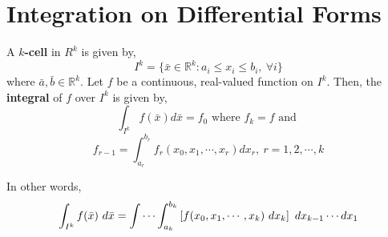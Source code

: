 \section{Integration on Differential Forms}
\begin{definition}
	A \textbf{$k$-cell} in $R^k$ is given by, 
	$$I^k = \{ \bar{x} \in \mathbb{R}^k : a_i \le x_i \le b_i,\ \forall i \}$$
	where $\bar{a},\bar{b} \in \mathbb{R}^k$.
	Let $f$ be a continuous, real-valued function on $I^k$.
	Then, the \textbf{integral} of $f$ over $I^k$ is given by,
	$$\int_{I^k}f(\bar{x}) d\bar{x} = f_0 \text{ where } f_k = f \text{ and }$$
	$$f_{r-1} = \int_{a_r}^{b_r} f_r(x_0,x_1,\cdots,x_r) dx_r,\ r = 1,2,\cdots,k$$
\begin{commentary}
	In other words,
	$$\int_{I^k} f(\bar{x})\ d\bar{x} = \idotsint_{a_k}^{b_k} \left[f(x_0,x_1,\cdots,x_k)\ dx_k\right]\ dx_{k-1}\cdots dx_1$$
\end{commentary}
\end{definition}

